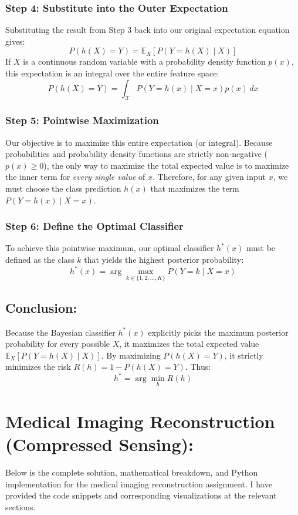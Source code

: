 \documentclass[twoside, 10pt]{article}
\begin{document}
\subsubsection*{Step 4: Substitute into the Outer Expectation}
Substituting the result from Step 3 back into our original expectation equation gives:
\[
P(h(X) = Y) = \mathbb{E}_X [P(Y = h(X) \mid X)]
\]
If $X$ is a continuous random variable with a probability density function $p(x)$, this expectation is an integral over the entire feature space:
\[
P(h(X) = Y) = \int_{\mathcal{X}} P(Y = h(x) \mid X=x) p(x) \, dx
\]
\subsubsection*{Step 5: Pointwise Maximization}
Our objective is to maximize this entire expectation (or integral). Because probabilities and probability density functions are strictly non-negative ($p(x) \ge 0$), the only way to maximize the total expected value is to maximize the inner term for \textit{every single value} of $x$.
Therefore, for any given input $x$, we must choose the class prediction $h(x)$ that maximizes the term $P(Y = h(x) \mid X=x)$.
\subsubsection*{Step 6: Define the Optimal Classifier}
To achieve this pointwise maximum, our optimal classifier $h^*(x)$ must be defined as the class $k$ that yields the highest posterior probability:
\[
h^*(x) = \arg\max_{k \in \{1, 2, \dots, K\}} P(Y = k \mid X=x)
\]
\subsection{Conclusion:}
Because the Bayesian classifier $h^*(x)$ explicitly picks the maximum posterior probability for every possible $X$, it maximizes the total expected value $\mathbb{E}_X [P(Y = h(X) \mid X)]$. 
By maximizing $P(h(X) = Y)$, it strictly minimizes the risk $R(h) = 1 - P(h(X) = Y)$. 
Thus:
\[
h^* = \arg\min_h R(h)
\]

\section{Medical Imaging Reconstruction (Compressed Sensing):}
Below is the complete solution, mathematical breakdown, and Python implementation for the medical imaging reconstruction assignment. I have provided the code snippets and corresponding visualizations at the relevant sections.
\end{document}
